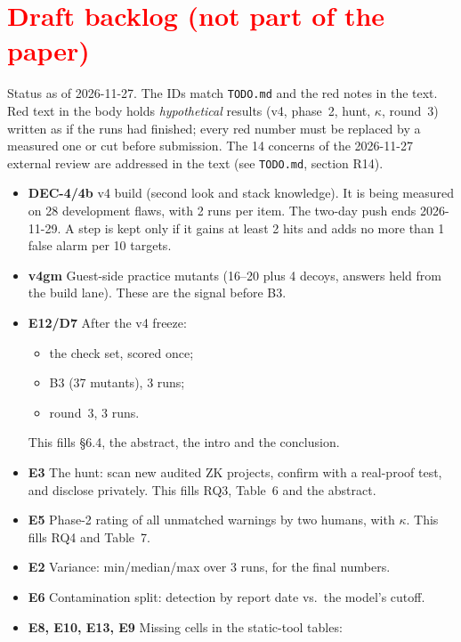 \clearpage
\section*{\textcolor{red}{Draft backlog (not part of the paper)}}
{\color{red}\small
Status as of 2026-11-27. The IDs match \texttt{TODO.md} and the red notes in
the text. Red text in the body holds \emph{hypothetical} results (v4, phase~2,
hunt, $\kappa$, round~3) written as if the runs had finished; every red number
must be replaced by a measured one or cut before submission. The 14 concerns
of the 2026-11-27 external review are addressed in the text (see
\texttt{TODO.md}, section R14).

\begin{itemize}\setlength\itemsep{0pt}
\item \textbf{DEC-4/4b} v4 build (second look and stack knowledge). It is
being measured on 28 development flaws, with 2 runs per item. The two-day
push ends 2026-11-29. A step is kept only if it gains at least 2 hits and adds
no more than 1 false alarm per 10 targets.
\item \textbf{v4gm} Guest-side practice mutants (16--20 plus 4 decoys,
answers held from the build lane). These are the signal before B3.
\item \textbf{E12/D7} After the v4 freeze:
  \begin{itemize}\setlength\itemsep{0pt}
  \item the check set, scored once;
  \item B3 (37 mutants), 3 runs;
  \item round~3, 3 runs.
  \end{itemize}
  This fills §6.4, the abstract, the intro and the conclusion.
\item \textbf{E3} The hunt: scan new audited ZK projects, confirm with a
real-proof test, and disclose privately. This fills RQ3, Table~6 and the
abstract.
\item \textbf{E5} Phase-2 rating of all unmatched warnings by two humans,
with $\kappa$. This fills RQ4 and Table~7.
\item \textbf{E2} Variance: min/median/max over 3 runs, for the final numbers.
\item \textbf{E6} Contamination split: detection by report date vs.\ the
model's cutoff.
\item \textbf{E8, E10, E13, E9} Missing cells in the static-tool tables:
  \begin{itemize}\setlength\itemsep{0pt}

\end{itemize}
\end{itemize}}
